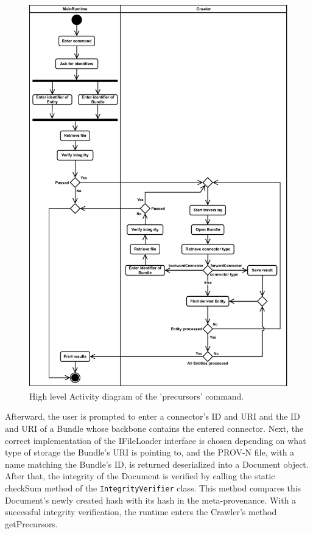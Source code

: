 \documentclass[
  digital,     %
  oneside,     %
  nosansbold,  %
  nocolorbold, %
  lof,         %
  lot,         %
]{fithesis4}
\begin{document}
\begin{figure}[htbp]
  \begin{center}
    \includegraphics[width=12cm]{fithesis/images/runtime.pdf}
  \end{center}
  \caption{High level Activity diagram of the 'precursors' command.}
  \label{fig:runtime}
\end{figure}
 
Afterward, the user is prompted to enter a connector's ID and URI and the ID and URI of a Bundle whose backbone contains the entered connector. Next, the correct implementation of the IFileLoader interface is chosen depending on what type of storage the Bundle's URI is pointing to, and the PROV-N file, with a name matching the Bundle's ID, is returned deserialized into a Document object. After that, the integrity of the Document is verified by calling the static checkSum method of the \texttt{IntegrityVerifier} class. This method compares this Document's newly created hash with its hash in the meta-provenance. With a successful integrity verification, the runtime enters the Crawler's method getPrecursors.
\end{document}
